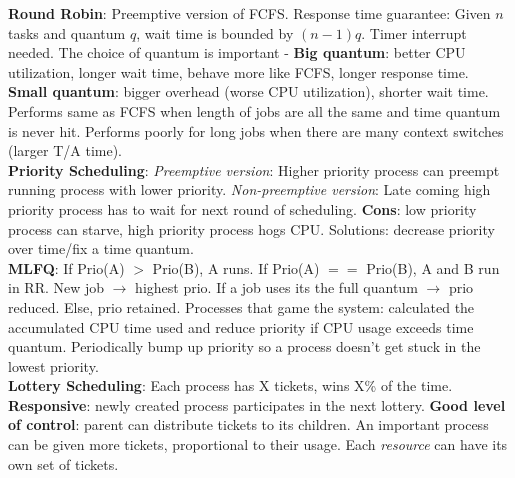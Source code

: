 \documentclass{article}
\begin{document}
\begin{multicols*}{3}
\textbf{Round Robin}: Preemptive version of FCFS. Response time guarantee: Given $n$ tasks and quantum $q$, wait time is bounded by $(n-1)q$. Timer interrupt needed. The choice of quantum is important - \textbf{Big quantum}: better CPU utilization, longer wait time, behave more like FCFS, longer response time. \textbf{Small quantum}: bigger overhead (worse CPU utilization), shorter wait time. Performs same as FCFS when length of jobs are all the same and time quantum is never hit. Performs poorly for long jobs when there are many context switches (larger T/A time). \\
\textbf{Priority Scheduling}: \textit{Preemptive version}: Higher priority process can preempt running process with lower priority. \textit{Non-preemptive version}: Late coming high priority process has to wait for next round of scheduling. \textbf{Cons}: low priority process can starve, high priority process hogs CPU. Solutions: decrease priority over time/fix a time quantum. \\
\textbf{MLFQ}: If Prio(A) $>$ Prio(B), A runs. If Prio(A) $==$ Prio(B), A and B run in RR. New job $\to$ highest prio. If a job uses its the full quantum $\to$ prio reduced. Else, prio retained. Processes that game the system: calculated the accumulated CPU time used and reduce priority if CPU usage exceeds time quantum. Periodically bump up priority so a process doesn't get stuck in the lowest priority. \\
\textbf{Lottery Scheduling}: Each process has X tickets, wins X\% of the time. \textbf{Responsive}: newly created process participates in the next lottery. \textbf{Good level of control}: parent can distribute tickets to its children. An important process can be given more tickets, proportional to their usage. Each \textit{resource} can have its own set of tickets. 

\end{multicols*}
\end{document}
